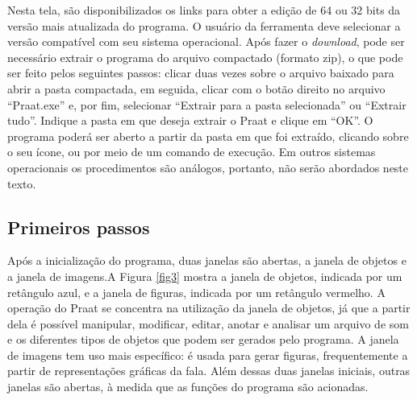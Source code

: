 \documentclass[portuguese]{textolivre}
\begin{document}
Nesta tela, são disponibilizados os links para obter a edição de 64 ou 32 bits da versão mais atualizada do programa. O usuário da ferramenta deve selecionar a versão compatível com seu sistema operacional. Após fazer o \textit{download}, pode ser necessário extrair o programa do arquivo compactado (formato zip), o que pode ser feito pelos seguintes passos: clicar duas vezes sobre o arquivo baixado para abrir a pasta compactada, em seguida, clicar com o botão direito no arquivo ``Praat.exe'' e, por fim, selecionar ``Extrair para a pasta selecionada'' ou ``Extrair tudo''. Indique a pasta em que deseja extrair o Praat e clique em ``OK''. O programa poderá ser aberto a partir da pasta em que foi extraído, clicando sobre o seu ícone, ou por meio de um comando de execução. Em outros sistemas operacionais os procedimentos são análogos, portanto, não serão abordados neste texto.

\subsection{Primeiros passos}\label{sec-primeiros}
Após a inicialização do programa, duas janelas são abertas, a janela de objetos e a janela de imagens.A Figura \ref{fig3} mostra a janela de objetos, indicada por um retângulo azul, e a janela de figuras, indicada por um retângulo vermelho. A operação do Praat se concentra na utilização da janela de objetos, já que a partir dela é possível manipular, modificar, editar, anotar e analisar um arquivo de som e os diferentes tipos de objetos que podem ser gerados pelo programa. A janela de imagens tem uso mais específico: é usada para gerar figuras, frequentemente a partir de representações gráficas da fala. Além dessas duas janelas iniciais, outras janelas são abertas, à medida que as funções do programa são acionadas.
\end{document}
